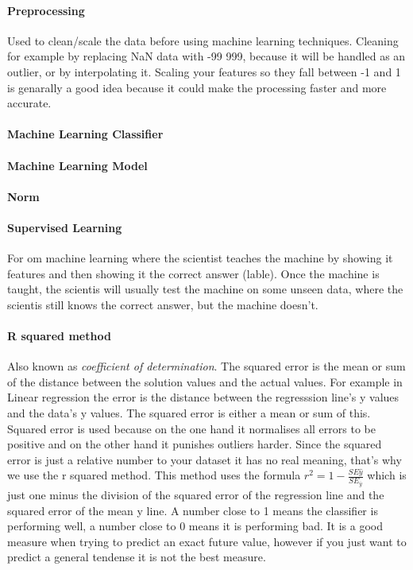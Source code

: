\paragraph{Preprocessing} 
Used to clean/scale the data before using machine learning techniques. Cleaning for example by replacing NaN data with -99 999, because it will be handled as an outlier, or by interpolating it. Scaling your features so they fall between -1 and 1 is genarally a good idea because it could make the processing faster and more accurate.

\paragraph{Machine Learning Classifier} %

\paragraph{Machine Learning Model} %

\paragraph{Norm} %

\paragraph{Supervised Learning} 
For om machine learning where the scientist teaches the machine by showing it features and then showing it the correct answer (lable). Once the machine is taught, the scientis will usually test the machine on some unseen data, where the scientis still knows the correct answer, but the machine doesn't.

\paragraph{R squared method}
Also known as \emph{coefficient of determination}. The squared error is the mean or sum of the distance between the solution values and the actual values. For example in Linear regression the error is the distance between the regresssion line's y values and the data's y values. The squared error is either a mean or sum of this. Squared error is used because on the one hand it normalises all errors to be positive and on the other hand it punishes outliers harder. Since the squared error is just a relative number to your dataset it has no real meaning, that's why we use the r squared method. This method uses the formula $r^2 = 1 - \frac{SE\hat{y}}{SE_{\overline{y}}}$ which is just one minus the division of the squared error of the regression line and the squared error of the mean y line. A number close to 1 means the classifier is performing well, a number close to 0 means it is performing bad. It is a good measure when trying to predict an exact future value, however if you just want to predict a general tendense it is not the best measure.

